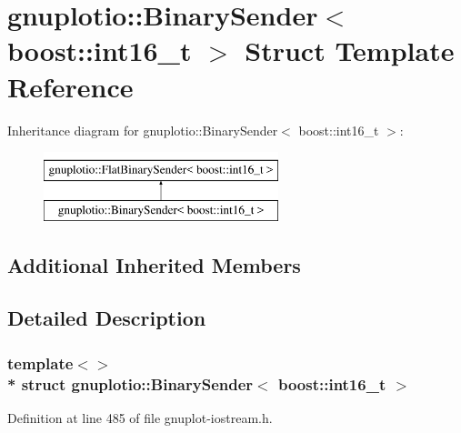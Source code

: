 \hypertarget{structgnuplotio_1_1_binary_sender_3_01boost_1_1int16__t_01_4}{}\section{gnuplotio\+:\+:Binary\+Sender$<$ boost\+:\+:int16\+\_\+t $>$ Struct Template Reference}
\label{structgnuplotio_1_1_binary_sender_3_01boost_1_1int16__t_01_4}
Inheritance diagram for gnuplotio\+:\+:Binary\+Sender$<$ boost\+:\+:int16\+\_\+t $>$\+:\begin{figure}[H]
\begin{center}
\leavevmode
\includegraphics[height=2.000000cm]{structgnuplotio_1_1_binary_sender_3_01boost_1_1int16__t_01_4}
\end{center}
\end{figure}
\subsection*{Additional Inherited Members}


\subsection{Detailed Description}
\subsubsection*{template$<$$>$\\*
struct gnuplotio\+::\+Binary\+Sender$<$ boost\+::int16\+\_\+t $>$}



Definition at line 485 of file gnuplot-\/iostream.\+h.

